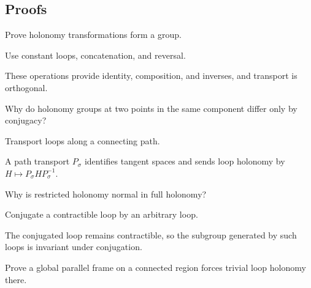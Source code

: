 \subsection*{Proofs}

\begin{exercise}\label{exr:vii25-ped-06}
Prove holonomy transformations form a group.
\end{exercise}

\begin{hint}
Use constant loops, concatenation, and reversal.
\end{hint}

\begin{solution}
These operations provide identity, composition, and inverses, and transport is orthogonal.
\end{solution}

\begin{exercise}\label{exr:vii25-ped-07}
Why do holonomy groups at two points in the same component differ only by conjugacy?
\end{exercise}

\begin{hint}
Transport loops along a connecting path.
\end{hint}

\begin{solution}
A path transport \(P_\sigma\) identifies tangent spaces and sends loop holonomy by \(H\mapsto P_\sigma H P_\sigma^{-1}\).
\end{solution}

\begin{exercise}\label{exr:vii25-ped-08}
Why is restricted holonomy normal in full holonomy?
\end{exercise}

\begin{hint}
Conjugate a contractible loop by an arbitrary loop.
\end{hint}

\begin{solution}
The conjugated loop remains contractible, so the subgroup generated by such loops is invariant under conjugation.
\end{solution}

\begin{exercise}\label{exr:vii25-ped-09}
Prove a global parallel frame on a connected region forces trivial loop holonomy there.
\end{exercise}

